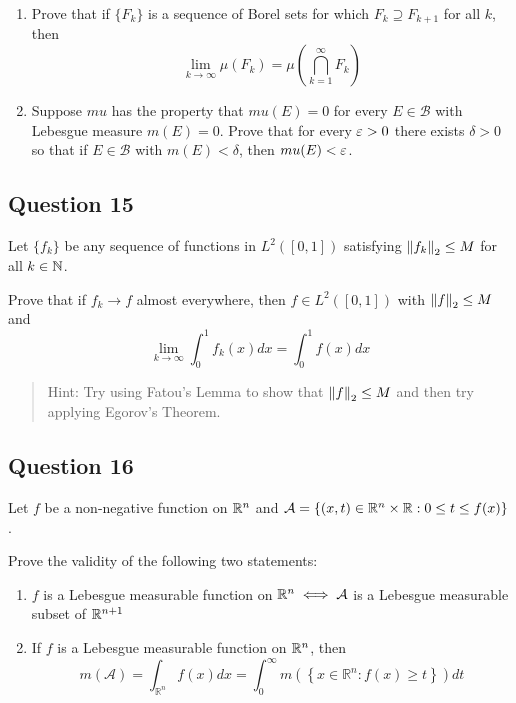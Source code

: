 \documentclass[12pt]{article}
\begin{document}
\begin{enumerate}
\def\labelenumi{\alph{enumi}.}
\item
  Prove that if \(\{F_k\}\) is a sequence of Borel sets for which
  \(F_k \supseteq F_{k+1}\) for all \(k\), then \[
  \lim _{k \rightarrow \infty} \mu\left(F_{k}\right)=\mu\left(\bigcap_{k=1}^{\infty} F_{k}\right)
  \]
\item
  Suppose \(mu\) has the property that \(mu(E) = 0\) for every
  \(E \in \mathcal B\) with Lebesgue measure \(m(E) = 0\). Prove that
  for every \(\varepsilon > 0\) there exists \(\delta > 0\) so that if
  \(E \in \mathcal B\) with \(m(E) < \delta\), then \(mu(E) < \varepsilon\).
\end{enumerate}

\hypertarget{question-15-1}{%
\subsection{Question 15}\label{question-15-1}}

Let \(\{f_k\}\) be any sequence of functions in \(L^2([0, 1])\)
satisfying \({\left\lVert {f_k} \right\rVert}_2 \leq M\) for all \(k \in {\mathbb{N}}\).

Prove that if \(f_k \to f\) almost everywhere, then
\(f \in L^2([0, 1])\) with \({\left\lVert {f} \right\rVert}_2 \leq M\) and \[
\lim _{k \rightarrow \infty} \int_{0}^{1} f_{k}(x) dx = \int_{0}^{1} f(x) d x
\]

\begin{quote}
Hint: Try using Fatou's Lemma to show that \({\left\lVert {f} \right\rVert}_2 \leq M\) and
then try applying Egorov's Theorem.
\end{quote}

\hypertarget{question-16-1}{%
\subsection{Question 16}\label{question-16-1}}

Let \(f\) be a non-negative function on \({\mathbb{R}}^n\) and
\(\mathcal A = \{(x, t) \in {\mathbb{R}}^n \times {\mathbb{R}} : 0 \leq t \leq f (x)\}\).

Prove the validity of the following two statements:

\begin{enumerate}
\def\labelenumi{\alph{enumi}.}
\item
  \(f\) is a Lebesgue measurable function on \({\mathbb{R}}^n \iff \mathcal A\)
  is a Lebesgue measurable subset of \({\mathbb{R}}^{n+1}\)
\item
  If \(f\) is a Lebesgue measurable function on \({\mathbb{R}}^n\), then \[
  m(\mathcal{A})=\int_{\mathbb{R}^{n}} f(x) d x=\int_{0}^{\infty} m\left(\left\{x \in \mathbb{R}^{n}: f(x) \geq t\right\}\right) d t
  \]
\end{enumerate}
\end{document}
